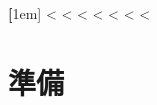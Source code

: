 \textbf %
[1em] %
\centering %
\footnotesize < \small < \normalsize < \large < \Large < \LARGE < \huge < \Huge %
\vspace{1em} %
\vfill %
\section[準備]{準備} %